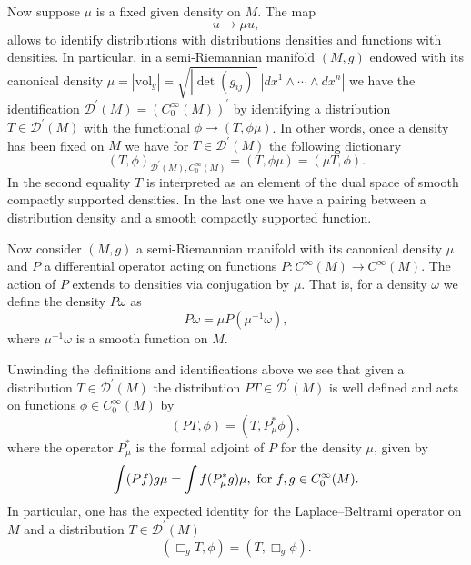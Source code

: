 \documentclass[12pt,reqno]{amsart}
\numberwithin{equation}{section}
\newcommand{\bg}{\Box_{g}}
\theoremstyle{definition}
\theoremstyle{plain}
\theoremstyle{definition}
\theoremstyle{definition}
\begin{document}
\bigskip

Now suppose $\mu$ is a fixed given density on $M$. The map
\begin{equation}
    u \to \mu u,
\end{equation}
allows to identify distributions with distributions densities and functions with densities. In particular, in a semi-Riemannian manifold $(M, g)$ endowed with its canonical density $\mu= |\mathrm{vol}_g| = \sqrt{|\det(g_{ij})|}\, |dx^1 \wedge \cdots \wedge dx^n|$ we have the identification $\mathcal{D}^\prime (M) = (C^\infty_0(M))^\prime$ by identifying a distribution $T \in  \mathcal{D}^\prime (M)$ with the functional $\phi \to (T, \phi \mu)$. In other words, once a density has been fixed on $M$ we have for $T \in  \mathcal{D}^\prime (M)$ the following dictionary
\begin{equation}
    (T, \phi)_{\mathcal{D}^\prime (M), C^\infty_0(M)}=(T , \phi \mu)=(\mu T, \phi).
\end{equation}
In the second equality $T$ is interpreted  as an element of the dual space of smooth compactly supported densities. In the last one we have a pairing between a distribution density and a smooth compactly supported function.

Now consider $(M,g)$ a semi-Riemannian manifold with its canonical density $\mu$ and $P$ a differential operator acting on functions $P: C^\infty(M) \to C^\infty(M)$. The action of $P$ extends to densities via conjugation by $\mu$. That is, for a density $\omega $ we define the density $P \omega$ as
\begin{equation}
    P \omega= \mu P(\mu^{-1}\omega),
\end{equation}
where $\mu^{-1} \omega$ is a smooth function on $M$.

Unwinding the definitions and identifications above we see that given a distribution $T \in \mathcal{D}^\prime(M)$ the distribution $PT \in \mathcal{D}^\prime (M) $ is well defined and acts on functions $\phi \in C^\infty_0(M)$ by
\begin{equation}
    (PT, \phi)=(T, P^*_\mu \phi),
\end{equation}
where the operator $P^*_\mu$ is the formal adjoint of $P$ for the density $\mu$, given by
$$
\int (Pf) g \mu = \int f (P^*_\mu g) \mu, \textnormal{ for } f,g \in C^\infty_0(M).
$$
In particular, one has the expected identity for the Laplace--Beltrami operator on $M$ and a distribution $T \in \mathcal{D}^\prime(M)$
\begin{equation}
    (\bg T,\phi)=(T, \bg \phi).
\end{equation}







\end{document}
